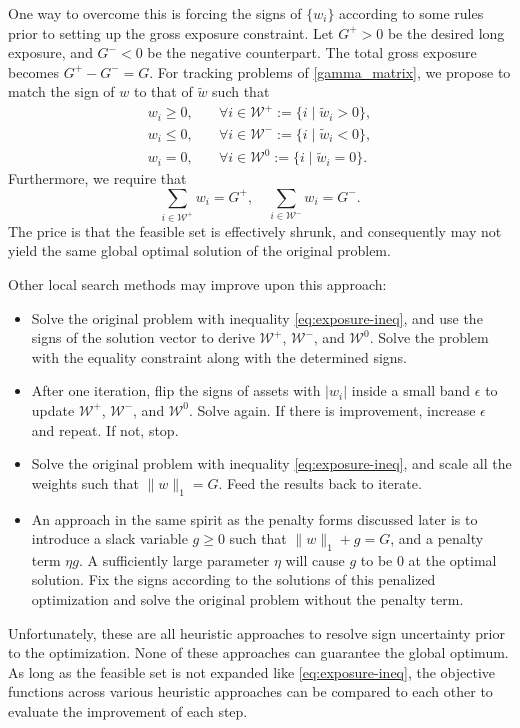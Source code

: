 \documentclass[11pt, letterpaper]{article}
\begin{document}
One way to overcome this is forcing the signs of $\{w_i\}$ according to some rules prior to setting up the gross exposure
constraint. Let $G^+ > 0$ be the desired long exposure, and $G^- < 0$ be the negative counterpart. The total gross exposure
becomes $G^+ - G^- = G$. For tracking problems of \eqref{gamma_matrix}, we propose to match the sign of $w$ to that of
$\tilde{w}$ such that
\begin{equation}
  \label{eq:gross_exposure}
  \begin{aligned}
    w_i \geq 0, \quad & \forall i\in\mathcal{W}^+ := \{i \mid \tilde{w}_i > 0\} ,\\
    w_i \leq 0, \quad & \forall i\in\mathcal{W}^- := \{i \mid \tilde{w}_i < 0\} ,\\
    w_i = 0, \quad & \forall i\in\mathcal{W}^0 := \{i \mid \tilde{w}_i = 0\}.
  \end{aligned}
\end{equation}
Furthermore, we require that
\begin{equation*}
	\sum_{i\in\mathcal{W}^+}w_i = G^+, \quad \sum_{i\in\mathcal{W}^-}w_i = G^-.
\end{equation*}
The price is that the feasible set is effectively shrunk, and consequently may not yield the same global optimal solution of
the original problem.

Other local search methods may improve upon this approach:
\begin{itemize}
\item Solve the original problem with inequality \eqref{eq:exposure-ineq}, and use the signs of the solution vector to derive
  $\mathcal{W}^+$, $\mathcal{W}^-$, and $\mathcal{W}^0$. Solve the problem with the equality constraint along with the
  determined signs.
\item After one iteration, flip the signs of assets with $|w_i|$ inside a small band $\epsilon$ to update $\mathcal{W}^+$,
  $\mathcal{W}^-$, and $\mathcal{W}^0$. Solve again. If there is improvement, increase $\epsilon$ and repeat.  If not, stop.
\item Solve the original problem with inequality \eqref{eq:exposure-ineq}, and scale all the weights such that
  $\lVert w\rVert_1 = G$.  Feed the results back to iterate.
\item An approach in the same spirit as the penalty forms discussed later is to introduce a slack variable $g \geq 0$ such that
  $\lVert w\rVert_1 + g = G$, and a penalty term $\eta g$. A sufficiently large parameter $\eta$ will cause $g$ to be 0 at
  the optimal solution. Fix the signs according to the solutions of this penalized optimization and solve the original problem
  without the penalty term.
\end{itemize}
Unfortunately, these are all heuristic approaches to resolve sign uncertainty prior to the optimization. None of these
approaches can guarantee the global optimum. As long as the feasible set is not expanded like \eqref{eq:exposure-ineq}, the
objective functions across various heuristic approaches can be compared to each other to evaluate the improvement of each step.
\end{document}
